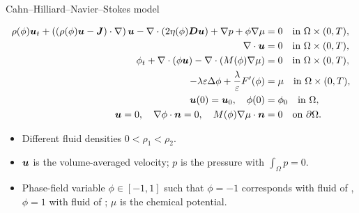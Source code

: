 
\begin{frame}[t,plain]
\titlepage
\end{frame}

\begin{frame}{Cahn--Hilliard--Navier--Stokes model}
  \footnotesize
  \vspace*{-0.4cm}
  \begin{block}{}
  \vspace*{-0.5cm}
  \begin{subequations}
      \begin{align*}
          \rho(\phi)\bm{u}_t+\left((\rho(\phi)\bm{u} - {\bm{J}}
          )\cdot\nabla\right)\bm{u}-\nabla\cdot(2\eta(\phi)\bm{D}\bm{u})+\nabla p 
          + \phi \nabla \mu&=0\quad\text{in }\Omega\times(0,T),\\
          \nabla\cdot\bm{u}&=0\quad\text{in }\Omega\times(0,T),\\
          \phi_t+\nabla\cdot(\phi\bm{u})-\nabla\cdot(M(\phi)\nabla \mu)&=0\quad\text{in }\Omega\times(0,T),\\
          -\lambda\varepsilon\Delta\phi+\frac{\lambda}{\varepsilon}F'(\phi)&=\mu\quad\text{in }\Omega\times(0,T),\\
          \bm{u}(0)=\bm{u}_0,\quad\phi(0)&=\phi_0\quad\text{in }\Omega,\\
          \bm{u}=0,\quad\nabla\phi\cdot{\bm{n}}=0,\quad M(\phi)\nabla\mu\cdot{\bm{n}}&=0\quad\text{on }\partial\Omega.
      \end{align*}
  \end{subequations}
  \end{block}
  \begin{itemize}
    \item<1-> Different fluid densities \alert {$0<\rho_1<\rho_2$}.
    \item<2-> \alert{$\bm{u}$} is the volume-averaged velocity; \alert{$p$} is the pressure with \alert{$\int_\Omega p=0$}.
    \item<3-> Phase-field variable \alert{$\phi\in [-1,1]$}
     such that \alert{$\phi=-1 $} corresponds with fluid of , \alert{$\phi=1 $} with fluid of ;
    \alert{$\mu$} is the chemical potential.
  \end{itemize}
\end{frame}

